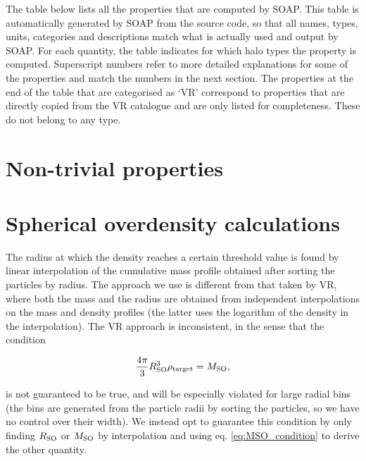 \documentclass{article}
\begin{document}
The table below lists all the properties that are computed by SOAP. This table is automatically generated by 
SOAP from the source code, so that all names, types, units, categories and descriptions match what is actually 
used and output by SOAP. For each quantity, the table indicates for which halo types the property is computed. 
Superscript numbers refer to more detailed explanations for some of the properties and match the numbers in 
the next section. The properties at the end of the table that are categorised as `VR' correspond to properties 
that are directly copied from the VR catalogue and are only listed for completeness. These do not belong to 
any type.



\section{Non-trivial properties}



\section{Spherical overdensity calculations}

The radius at which the density reaches a certain threshold value is found by linear interpolation of the 
cumulative mass profile obtained after sorting the particles by radius. The approach we use is different from 
that taken by VR, where both the mass and the radius are obtained from independent interpolations on the mass 
and density profiles (the latter uses the logarithm of the density in the interpolation). The VR approach is 
inconsistent, in the sense that the condition

\begin{equation}
    \frac{4\pi{}}{3} R_{\rm{}SO}^3 \rho{}_{\rm{}target} = M_{\rm{}SO},\label{eq:MSO_condition}
\end{equation}

is not guaranteed to be true, and will be especially violated for large radial bins (the bins are generated 
from the particle radii by sorting the particles, so we have no control over their width). We instead opt to 
guarantee this condition by only finding $R_{\rm{}SO}$ or $M_{\rm{}SO}$ by interpolation and using eq. 
\ref{eq:MSO_condition} to derive the other quantity.
\end{document}
